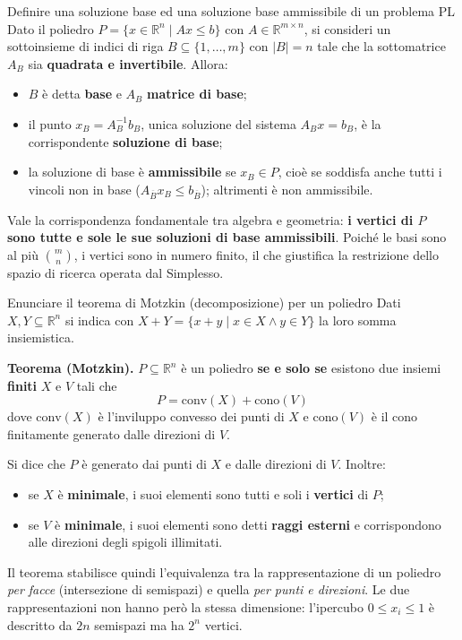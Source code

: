 \documentclass[12pt]{extarticle} %
\begin{document}
\begin{teoriabox}{Definire una soluzione base ed una soluzione base ammissibile di un problema PL}
Dato il poliedro $P = \{x \in \mathbb{R}^n \mid Ax \le b\}$ con $A \in \mathbb{R}^{m\times n}$, si consideri un sottoinsieme di indici di riga $B \subseteq \{1,\dots,m\}$ con $|B| = n$ tale che la sottomatrice $A_B$ sia \textbf{quadrata e invertibile}. Allora:
\begin{itemize}
    \item $B$ è detta \textbf{base} e $A_B$ \textbf{matrice di base};
    \item il punto $x_B = A_B^{-1}b_B$, unica soluzione del sistema $A_Bx = b_B$, è la corrispondente \textbf{soluzione di base};
    \item la soluzione di base è \textbf{ammissibile} se $x_B \in P$, cioè se soddisfa anche tutti i vincoli non in base ($A_{\overline{B}}x_B \le b_{\overline{B}}$); altrimenti è non ammissibile.
\end{itemize}
Vale la corrispondenza fondamentale tra algebra e geometria: \textbf{i vertici di $P$ sono tutte e sole le sue soluzioni di base ammissibili}. Poiché le basi sono al più $\binom{m}{n}$, i vertici sono in numero finito, il che giustifica la restrizione dello spazio di ricerca operata dal Simplesso.
\end{teoriabox}

\begin{teoriabox}{Enunciare il teorema di Motzkin (decomposizione) per un poliedro}
Dati $X, Y \subseteq \mathbb{R}^n$ si indica con $X+Y = \{x+y \mid x \in X \wedge y \in Y\}$ la loro somma insiemistica.

\noindent\textbf{Teorema (Motzkin).} $P \subseteq \mathbb{R}^n$ è un poliedro \textbf{se e solo se} esistono due insiemi \textbf{finiti} $X$ e $V$ tali che
\[
P = \text{conv}(X) + \text{cono}(V)
\]
dove $\text{conv}(X)$ è l'inviluppo convesso dei punti di $X$ e $\text{cono}(V)$ è il cono finitamente generato dalle direzioni di $V$.

\noindent Si dice che $P$ è generato dai punti di $X$ e dalle direzioni di $V$. Inoltre:
\begin{itemize}
    \item se $X$ è \textbf{minimale}, i suoi elementi sono tutti e soli i \textbf{vertici} di $P$;
    \item se $V$ è \textbf{minimale}, i suoi elementi sono detti \textbf{raggi esterni} e corrispondono alle direzioni degli spigoli illimitati.
\end{itemize}
Il teorema stabilisce quindi l'equivalenza tra la rappresentazione di un poliedro \textit{per facce} (intersezione di semispazi) e quella \textit{per punti e direzioni}. Le due rappresentazioni non hanno però la stessa dimensione: l'ipercubo $0 \le x_i \le 1$ è descritto da $2n$ semispazi ma ha $2^n$ vertici.
\end{teoriabox}
\end{document}
